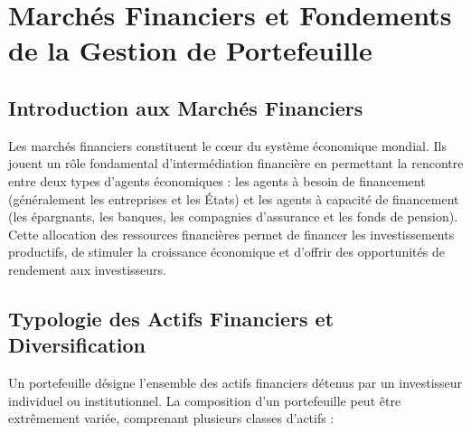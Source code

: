 \chapter{Marchés Financiers et Fondements de la Gestion de Portefeuille}

\section{Introduction aux Marchés Financiers}
Les marchés financiers constituent le cœur du système économique mondial. Ils jouent un rôle fondamental d'intermédiation financière en permettant la rencontre entre deux types d'agents économiques : les agents à besoin de financement (généralement les entreprises et les États) et les agents à capacité de financement (les épargnants, les banques, les compagnies d'assurance et les fonds de pension). Cette allocation des ressources financières permet de financer les investissements productifs, de stimuler la croissance économique et d'offrir des opportunités de rendement aux investisseurs.

\section{Typologie des Actifs Financiers et Diversification}
Un portefeuille désigne l'ensemble des actifs financiers détenus par un investisseur individuel ou institutionnel. La composition d'un portefeuille peut être extrêmement variée, comprenant plusieurs classes d'actifs :


